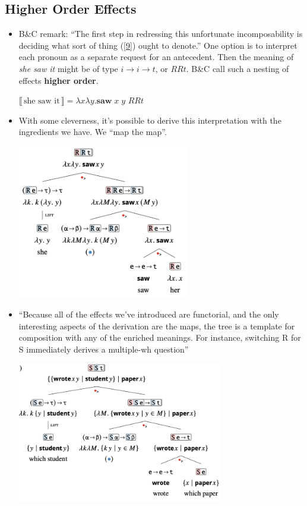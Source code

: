 \documentclass{article}
\newcommand{\intpt}[1]{{\llbracket \,#1\, \rrbracket}}
\begin{document}
\subsection{Higher Order Effects}

\begin{itemize}
  \item B\&C remark: ``The first step in redressing this unfortunate incomposability is deciding what
  sort of thing (\ref{9}) ought to denote.'' One option is to interpret each pronoun as a separate
  request for an antecedent. Then the meaning of \textit{she saw it} might be of type $i \to i \to t$,
  or $RRt$. B\&C call such a nesting of effects \textbf{higher order}.
  \begin{exe}
    \ex $\intpt{\text{she saw it}} = \lambda x \lambda y. \textbf{saw} \; x \; y$ \hfill $RRt$
  \end{exe}
  \item With some cleverness, it's possible to derive this interpretation with the ingredients we have. We ``map the map''.
  \begin{exe}
    \ex \label{10} \hfill
      \begin{center}
        \includegraphics[width=7.5cm]{clips/11.png}
      \end{center}
  \end{exe}
  \item ``Because all of the effects we've introduced are functorial, and the only
  interesting aspects of the derivation are the maps, the tree is a template
  for composition with any of the enriched meanings. For instance, switching R for S
  immediately derives a multiple-wh question''
  \begin{exe}
    \ex \label{12} \hfill
      \begin{center}
        \includegraphics[width=9cm]{clips/12.png}

\end{center}
\end{exe}
\end{itemize}
\end{document}
